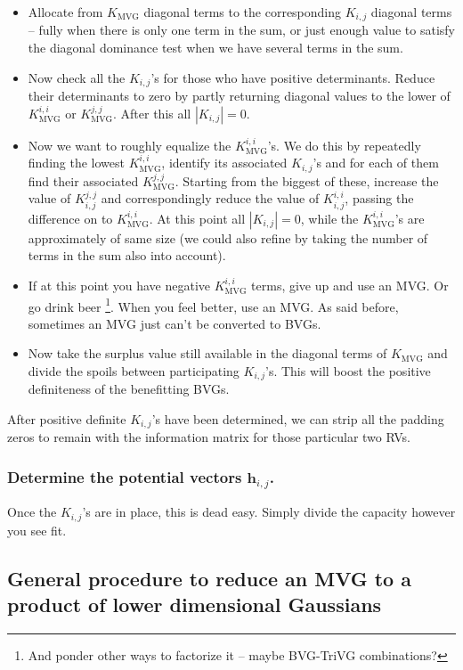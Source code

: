 \begin{itemize}
\item Allocate from $K_{\mbox{MVG}}$ diagonal terms to the corresponding
$K_{i,j}$ diagonal terms -- fully when there is only one term in
the sum, or just enough value to satisfy the diagonal dominance test
when we have several terms in the sum.
\item Now check all the $K_{i,j}$'s for those who have positive determinants.
Reduce their determinants to zero by partly returning diagonal values
to the lower of $K_{\mbox{MVG}}^{i,i}$ or $K_{\mbox{MVG}}^{j,j}$.
After this all $|K_{i,j}|=0$.
\item Now we want to roughly equalize the $K_{\mbox{MVG}}^{i,i}$'s. We
do this by repeatedly finding the lowest $K_{\mbox{MVG}}^{i,i}$,
identify its associated $K_{i,j}$'s and for each of them find their
associated $K_{\mbox{MVG}}^{j,j}$. Starting from the biggest of these,
increase the value of $K_{i,j}^{j,j}$ and correspondingly reduce
the value of $K_{i,j}^{i,i}$, passing the difference on to $K_{\mbox{MVG}}^{i,i}$.
At this point all $|K_{i,j}|=0$, while the $K_{\mbox{MVG}}^{i,i}$'s
are approximately of same size (we could also refine by taking the
number of terms in the sum also into account).
\item If at this point you have negative $K_{\mbox{MVG}}^{i,i}$ terms,
give up and use an MVG. Or go drink beer%
\footnote{And ponder other ways to factorize it -- maybe BVG-TriVG combinations?%
}. When you feel better, use an MVG. As said before, sometimes an MVG
just can't be converted to BVGs.
\item Now take the surplus value still available in the diagonal terms of
$K_{\mbox{MVG}}$ and divide the spoils between participating $K_{i,j}$'s.
This will boost the positive definiteness of the benefitting BVGs.
\end{itemize}
After positive definite $K_{i,j}$'s have been determined, we can
strip all the padding zeros to remain with the information matrix
for those particular two RVs.


\subsubsection{Determine the potential vectors $\mathbf{h}_{i,j}$.}

Once the $K_{i,j}$'s are in place, this is dead easy. Simply divide
the capacity however you see fit.


\subsection{General procedure to reduce an MVG to a product of lower dimensional
Gaussians}
